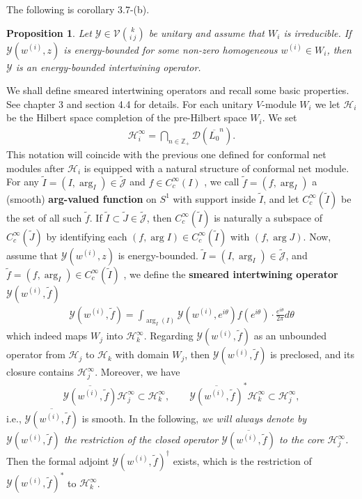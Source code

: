 \documentclass[12pt,a4paper]{article}
\theoremstyle{definition}
\theoremstyle{plain}
\newtheorem{pp}[df]{Proposition}
\newcommand{\mc}{\mathcal}
\newcommand{\wtd}{\widetilde}
\newcommand{\ovl}{\overline}
\newcommand{\Dom}{\scr D}
\newcommand{\scr}{\mathscr}
\newcommand{\Jtd}{\widetilde{\mathcal J}}
\newcommand{\mbb}{\mathbb}
\numberwithin{equation}{subsection}
\begin{document}
The following is \cite{Gui19a} corollary 3.7-(b).

\begin{pp}\label{lb53}
Let $\mc Y\in\mc V{k\choose i~j}$ be unitary and assume that $W_i$ is irreducible. If $\mc Y(w^{(i)},z)$ is energy-bounded for some non-zero homogeneous $w^{(i)}\in W_i$, then $\mc Y$ is an energy-bounded intertwining operator.
\end{pp}

We shall define smeared intertwining operators and recall some basic properties. See \cite{Gui19b} chapter 3 and \cite{Gui21a} section 4.4 for details. For each unitary $V$-module $W_i$ we let $\mc H_i$ be the Hilbert space completion of the pre-Hilbert space $W_i$. We set 
\begin{align*}
\mc H_i^\infty=\bigcap_{n\in\mbb Z_+}\Dom(\ovl{L_0}^n).
\end{align*}
This notation will coincide with the previous one defined for conformal net modules after $\mc H_i$ is equipped with a natural structure of conformal net module. For any $\wtd I=(I,\arg_I)\in\Jtd$ and $f\in C^\infty_c(I)$ , we call $\wtd f=(f,\arg_I)$ a (smooth) \textbf{arg-valued function} on $S^1$ with support inside $\wtd I$, and let $C^\infty_c(\wtd I)$ be the set of all such $\wtd f$.  If $\wtd I\subset\wtd J\in\Jtd$, then $C^\infty_c(\wtd I)$ is naturally a subspace of $C^\infty_c(\wtd J)$ by identifying each $(f,\arg I)\in C^\infty_c(\wtd I)$ with $(f,\arg J)$. Now, assume that $\mc Y(w^{(i)},z)$ is energy-bounded. $\wtd I=(I,\arg_I)\in\Jtd$, and $\wtd f=(f,\arg_I)\in C^\infty_c(\wtd I)$ , we  define the \textbf{smeared intertwining operator} $\mc Y(w^{(i)},\wtd f)$ 
\begin{align}
\mc Y(w^{(i)},\wtd f)=\int_{\arg_I(I)}\mc Y(w^{(i)},e^{i\theta})f(e^{i\theta})\cdot\frac{e^{i\theta}}{2\pi}d\theta
\end{align}
which indeed maps $W_j$ into $\mc H_k^\infty$.
Regarding $\mc Y(w^{(i)},\wtd f)$ as an unbounded operator from $\mc H_j$ to $\mc H_k$ with domain $W_j$, then $\mc Y(w^{(i)},\wtd f)$ is preclosed, and its closure  contains $\mc H_j^\infty$. Moreover, we have
\begin{gather*}
\ovl{\mc Y(w^{(i)},\wtd f)}\mc H_j^\infty\subset\mc H_k^\infty,\qquad \ovl{\mc Y(w^{(i)},\wtd f)}^*\mc H_k^\infty\subset\mc H_j^\infty,
\end{gather*}
i.e., $\ovl{\mc Y(w^{(i)},\wtd f)}$ is smooth. In the following, \emph{we will always denote by $\mc Y(w^{(i)},\wtd f)$ the restriction of the closed operator $\ovl{\mc Y(w^{(i)},\wtd f)}$ to the core $\mc H_j^\infty$.} Then the formal adjoint $\mc Y(w^{(i)},\wtd f)^\dagger$ exists, which is the restriction of $\mc Y(w^{(i)},\wtd f)^*$ to $\mc H_k^\infty$.
\end{document}
